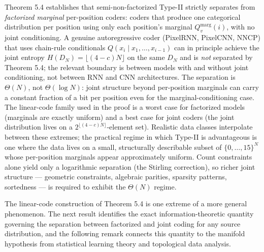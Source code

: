 \documentclass[
]{article}
\begin{document}
Theorem 5.4 establishes that semi-non-factorized Type-II strictly
separates from \emph{factorized marginal} per-position coders: coders
that produce one categorical distribution per position using only
each position's marginal $Q^{\text{marg}}_v(i)$, with no joint
conditioning. A genuine autoregressive coder (PixelRNN, PixelCNN,
NNCP) that uses chain-rule conditionals
$Q(x_i \mid x_1, \ldots, x_{i-1})$ can in principle achieve the
joint entropy $H(D_N) = \lfloor (4 - c)N \rfloor$ on the same $D_N$
and is \emph{not} separated by Theorem 5.4; the relevant boundary is
between models with and without joint conditioning, not between RNN
and CNN architectures. The separation is $\Theta(N)$, not
$\Theta(\log N)$: joint structure beyond per-position marginals can
carry a constant fraction of a bit per position even for the
marginal-conditioning case. The linear-code
family used in the proof is a worst case for factorized models
(marginals are exactly uniform) and a best case for joint coders (the
joint distribution lives on a $2^{\lfloor (4-c)N \rfloor}$-element set). Realistic
data classes interpolate between these extremes; the practical regime
in which Type-II is advantageous is one where the data lives on a
small, structurally describable subset of $\{0, \ldots, 15\}^N$ whose
per-position marginals appear approximately uniform. Count constraints
alone yield only a logarithmic separation (the Stirling correction),
so richer joint structure --- geometric constraints, algebraic
parities, sparsity patterns, sortedness --- is required to exhibit the
$\Theta(N)$ regime.

The linear-code construction of Theorem 5.4 is one extreme of a more
general phenomenon. The next result identifies the exact
information-theoretic quantity governing the separation between
factorized and joint coding for any source distribution, and the
following remark connects this quantity to the manifold hypothesis from
statistical learning theory and topological data analysis.
\end{document}
